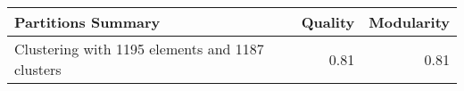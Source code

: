 \begin{tabular}{lrr}
\toprule
                             Partitions Summary &  Quality &  Modularity \\
\midrule
Clustering with 1195 elements and 1187 clusters &     0.81 &        0.81 \\
\bottomrule
\end{tabular}
